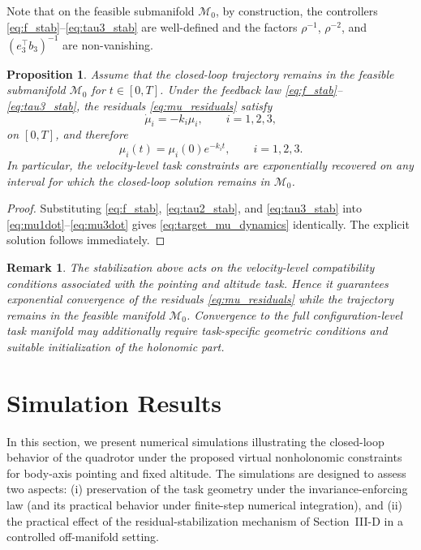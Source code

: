 \documentclass[letterpaper, 10 pt, conference]{ieeeconf}
\newtheorem{proposition}{Proposition}
\newtheorem{remark}{Remark}
\begin{document}
Note that on the feasible submanifold $\mathcal{M}_{0}$, by construction, the controllers \eqref{eq:f_stab}--\eqref{eq:tau3_stab} are well-defined and the factors \(\rho^{-1}\), \(\rho^{-2}\), and \((e_3^\top b_3)^{-1}\) are non-vanishing.


\begin{proposition}
Assume that the closed-loop trajectory remains in the feasible submanifold \(\mathcal{M}_{0}\) for \(t\in[0,T]\). Under the feedback law \eqref{eq:f_stab}--\eqref{eq:tau3_stab}, the residuals \eqref{eq:mu_residuals} satisfy
\[
\dot\mu_i = -k_i\mu_i,\qquad i=1,2,3,
\]
on \([0,T]\), and therefore
\[
\mu_i(t)=\mu_i(0)e^{-k_i t}, \qquad i=1,2,3.
\]
In particular, the velocity-level task constraints are exponentially recovered on any interval for which the closed-loop solution remains in \(\mathcal{M}_{0}\).
\end{proposition}

\begin{proof}
Substituting \eqref{eq:f_stab}, \eqref{eq:tau2_stab}, and \eqref{eq:tau3_stab} into \eqref{eq:mu1dot}--\eqref{eq:mu3dot} gives \eqref{eq:target_mu_dynamics} identically. The explicit solution follows immediately. 
\end{proof}

\begin{remark}
The stabilization above acts on the \emph{velocity-level} compatibility conditions associated with the pointing and altitude task. Hence it guarantees exponential convergence of the residuals \eqref{eq:mu_residuals} while the trajectory remains in the feasible manifold $\mathcal{M}_{0}$. Convergence to the full configuration-level task manifold may additionally require task-specific geometric conditions and suitable initialization of the holonomic part.
\end{remark}


\section{Simulation Results}\label{sec:simulations}

In this section, we present numerical simulations illustrating the closed-loop behavior of the quadrotor under the proposed virtual nonholonomic constraints for body-axis pointing and fixed altitude. The simulations are designed to assess two aspects: (i) preservation of the task geometry under the invariance-enforcing law (and its practical behavior under finite-step numerical integration), and (ii) the practical effect of the residual-stabilization mechanism of Section~III-D in a controlled off-manifold setting.
\end{document}
